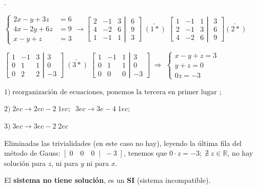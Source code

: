 \begin{ejem}.

$\begin{cases}
2x-y+3z&=6\\4x-2y+6z&=9\\x-y+z&=3	
\end{cases} \to \left[ \begin{matrix}
 2&-1&3\\4&-2&6\\1&-1&1	
 \end{matrix}\right. 
 \left| \begin{matrix}
 \; 6\\\; 9\\\; 3	
 \end{matrix}\right] \;\underrightarrow {(1*)} \;  
 \left[ \begin{matrix}
 1&-1&1\\2&-1&3\\4&-2&6	
 \end{matrix}\right. 
 \left| \begin{matrix}
 \; 3\\\; 6\\\; 9		
 \end{matrix}\right] \underrightarrow {(2*)} \; $
 
 $ 
 \left[ \begin{matrix}
 1&-1&3\\0&1&1\\0&2&2	
 \end{matrix}\right. 
 \left| \begin{matrix}
 3\\0\\-3	
 \end{matrix}\right] \; \underrightarrow {(3*)} \; 
 \left[ \begin{matrix}
 1&-1&1\\0&1&1\\ 0&0&0
 \end{matrix}\right. 
 \left| \begin{matrix}
 3\\0\\-3	
 \end{matrix}\right] \;  \Rightarrow  \; \begin{cases}
 x-y+z=3\\ y+z=0\\0z=-3	
 \end{cases}$

 
 \textcolor{gris}{$1)\; \text {reorganización de ecuaciones, ponemos la tercera en primer lugar };$}
 
 \textcolor{gris}{$ 2) \; 2ec \to 2ec-2\; 1ec  ; \; \; 3ec \to 3e -4\; 1ec; $}
 
  \textcolor{gris}{ $  3) \; 3ec \to 3ec-2\; 2ec $}
 
 
 Eliminadas las trivialidades (en este caso no hay), leyendo la última fila del método de Gauss: $[\;0\quad 0\quad 0 \; \; | \; \; -3 \; ]$, tenemos que $0\cdot z=-3; \; \nexists \;z\in \mathbb R$, no hay solución para $z$, ni para $y$ ni para $x$.

  El \textbf{sistema no tiene solución}, es un \textbf{SI} (sistema incompatible).
\end{ejem}



